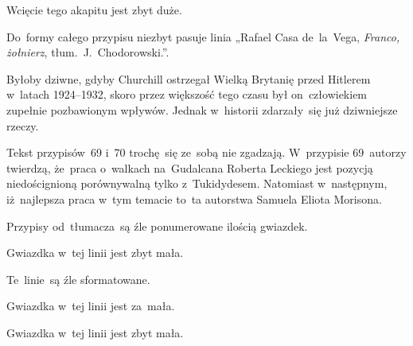 \documentclass[a4paper,11pt]{article}
\begin{document}
\noindent
{} Wcięcie tego akapitu jest zbyt duże.

\VerSpaceFour





\noindent
{} Do~formy całego przypisu niezbyt pasuje linia „Rafael
Casa de~la~Vega, \textit{Franco, żołnierz}, tłum.~J.~Chodorowski.”.

\VerSpaceFour





\noindent
{} Byłoby dziwne, gdyby Churchill ostrzegał Wielką Brytanię przed
Hitlerem w~latach 1924--1932, skoro przez większość tego czasu był
on~człowiekiem zupełnie pozbawionym wpływów. Jednak w~historii zdarzały~się
już dziwniejsze rzeczy.

\VerSpaceFour





\noindent
{} Tekst przypisów~69 i~70 trochę~się ze~sobą nie zgadzają.
W~przypisie 69~autorzy twierdzą, że~praca o~walkach na~Gudalcana Roberta
Leckiego jest pozycją niedoścignioną porównywalną tylko z~Tukidydesem.
Natomiast w~następnym, iż~najlepsza praca w~tym temacie to~ta autorstwa
Samuela Eliota Morisona.

\VerSpaceFour





\noindent
{} Przypisy od~tłumacza~są źle ponumerowane ilością gwiazdek.

\VerSpaceFour





\noindent
{} Gwiazdka w~tej linii jest zbyt mała.

\VerSpaceFour





\noindent
{} Te~linie~są źle sformatowane.

\VerSpaceFour





\noindent
{} Gwiazdka w~tej linii jest za~mała.

\VerSpaceFour





\noindent
{} Gwiazdka w~tej linii jest zbyt mała.
\end{document}
